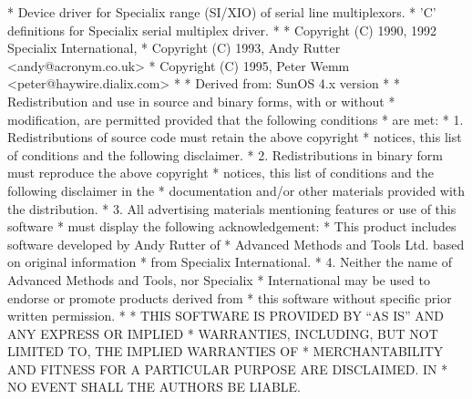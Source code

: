 \begin{copyrightEnv}
 * Device driver for Specialix range (SI/XIO) of serial line multiplexors.
 * 'C' definitions for Specialix serial multiplex driver.
 *
 * Copyright (C) 1990, 1992 Specialix International,
 * Copyright (C) 1993, Andy Rutter <andy@acronym.co.uk>
 * Copyright (C) 1995, Peter Wemm <peter@haywire.dialix.com>
 *
 * Derived from:        SunOS 4.x version
 *
 * Redistribution and use in source and binary forms, with or without
 * modification, are permitted provided that the following conditions
 * are met:
 * 1. Redistributions of source code must retain the above copyright
 *    notices, this list of conditions and the following disclaimer.
 * 2. Redistributions in binary form must reproduce the above copyright
 *    notices, this list of conditions and the following disclaimer in the
 *    documentation and/or other materials provided with the distribution.
 * 3. All advertising materials mentioning features or use of this software
 *    must display the following acknowledgement:
 *      This product includes software developed by Andy Rutter of
 *      Advanced Methods and Tools Ltd. based on original information
 *      from Specialix International.
 * 4. Neither the name of Advanced Methods and Tools, nor Specialix
 *    International may be used to endorse or promote products derived from
 *    this software without specific prior written permission.
 *
 * THIS SOFTWARE IS PROVIDED BY ``AS IS'' AND ANY EXPRESS OR IMPLIED
 * WARRANTIES, INCLUDING, BUT NOT LIMITED TO, THE IMPLIED WARRANTIES OF
 * MERCHANTABILITY AND FITNESS FOR A PARTICULAR PURPOSE ARE DISCLAIMED. IN
 * NO EVENT SHALL THE AUTHORS BE LIABLE.
\end{copyrightEnv}

